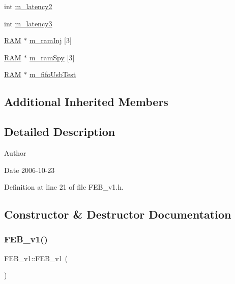 \begin{DoxyCompactItemize}
\item 
int \hyperlink{classFEB__v1_a2c4b18efd76de3bf7089bba57fb6744f}{m\+\_\+latency2}
\item 
int \hyperlink{classFEB__v1_a2f71bdcef05c845177a62610da490bf9}{m\+\_\+latency3}
\item 
\hyperlink{classRAM}{R\+AM} $\ast$ \hyperlink{classFEB__v1_a3a3d06225c94c88d4cc5da7a6bde3867}{m\+\_\+ram\+Inj} \mbox{[}3\mbox{]}
\item 
\hyperlink{classRAM}{R\+AM} $\ast$ \hyperlink{classFEB__v1_ae6d8176c12bd60ad25ed81d535eb8c82}{m\+\_\+ram\+Spy} \mbox{[}3\mbox{]}
\item 
\hyperlink{classRAM}{R\+AM} $\ast$ \hyperlink{classFEB__v1_a5850ce498462009212ad3f313fcf0bd6}{m\+\_\+fifo\+Usb\+Test}
\end{DoxyCompactItemize}
\subsection*{Additional Inherited Members}


\subsection{Detailed Description}
\begin{DoxyAuthor}{Author}

\end{DoxyAuthor}
\begin{DoxyDate}{Date}
2006-\/10-\/23 
\end{DoxyDate}


Definition at line 21 of file F\+E\+B\+\_\+v1.\+h.



\subsection{Constructor \& Destructor Documentation}
\mbox{\label{classFEB__v1_aad65ff3d95f3f60583dad914f9c18a9d}} 
\subsubsection{\texorpdfstring{F\+E\+B\+\_\+v1()}{FEB\_v1()}}
{\footnotesize\ttfamily F\+E\+B\+\_\+v1\+::\+F\+E\+B\+\_\+v1 (\begin{DoxyParamCaption}{ }\end{DoxyParamCaption})}



